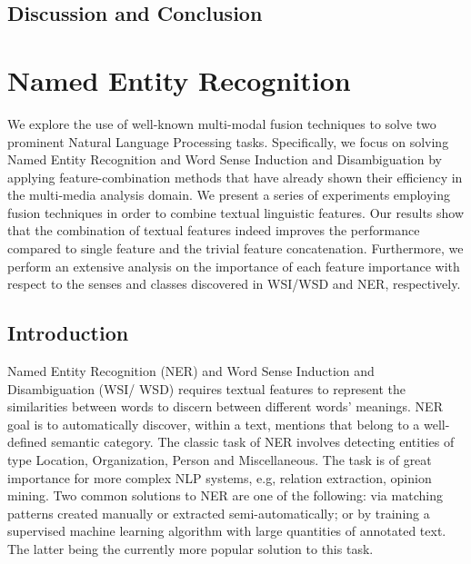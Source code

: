 \subsection{Discussion and Conclusion}

\section{Named Entity Recognition}
\label{chap:fusion}
\begin{abstractchap}
We explore the use of well-known multi-modal fusion techniques to solve two prominent Natural Language Processing tasks. Specifically, we focus on solving Named Entity Recognition and Word Sense Induction and Disambiguation by applying feature-combination methods that have already shown their efficiency in the multi-media analysis domain. We present a series of experiments employing fusion techniques in order to combine textual linguistic features. Our results show that the combination of textual features indeed improves the performance compared to single feature and the trivial feature concatenation. Furthermore, we perform an extensive analysis on the importance of each feature importance with respect to the senses and classes discovered in WSI/WSD and NER, respectively.
\end{abstractchap}


\subsection{Introduction}
Named Entity Recognition (NER) and Word Sense Induction and Disambiguation (WSI/ \allowbreak WSD) requires textual features to represent the similarities between words to discern between different words' meanings. NER goal is to automatically discover, within a text, mentions that belong to a well-defined semantic category. The classic task of NER involves detecting entities of type Location, Organization, Person and Miscellaneous. The task is of great importance for more complex NLP systems, e.g, relation extraction, opinion mining. Two common solutions to NER are one of the following: via matching patterns created manually or extracted semi-automatically; or by training a supervised machine learning algorithm with large quantities of annotated text. The latter being the currently more popular solution to this task.





